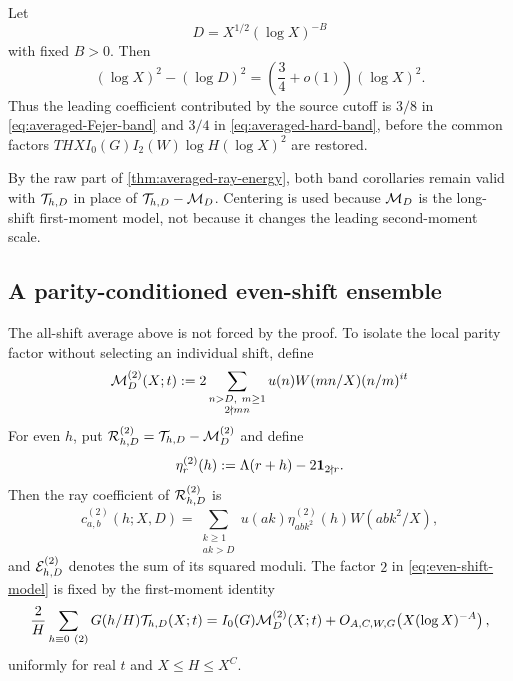 \begin{corollary}
\label{cor:TPC10-truncation}
Let
\[
 D=X^{1/2}(\log X)^{-B}
\]
with fixed $B>0$.  Then
\begin{equation}
 (\log X)^2-(\log D)^2
 =\left(\frac34+o(1)\right)(\log X)^2.
 \label{eq:three-quarter-source-energy}
\end{equation}
Thus the leading coefficient contributed by the source cutoff is
$3/8$ in \eqref{eq:averaged-Fejer-band} and $3/4$ in
\eqref{eq:averaged-hard-band}, before the common factors
$THX I_0(G)I_2(W)\log H(\log X)^2$ are restored.
\end{corollary}

\begin{remark}
By the raw part of \cref{thm:averaged-ray-energy}, both band corollaries
remain valid with $\mathcal T_{h,D}$ in place of $\mathcal T_{h,D}-\mathcal M_D$.  Centering is
used because $\mathcal M_D$ is the long-shift first-moment model, not because it
changes the leading second-moment scale.
\end{remark}

\subsection{A parity-conditioned even-shift ensemble}

The all-shift average above is not forced by the proof.  To isolate the
local parity factor without selecting an individual shift, define
\begin{equation}
 \mathcal M_D^{(2)}(X;t)
 :=2\sum_{\substack{n>D,\ m\geq1\\2\nmid mn}}
 u(n)W(mn/X)(n/m)^{it}
 \label{eq:even-shift-model}
\end{equation}
For even $h$, put $\mathcal R^{(2)}_{h,D}=\mathcal T_{h,D}-\mathcal M_D^{(2)}$ and define
\begin{equation}
 \eta_r^{(2)}(h):=\Lambda(r+h)-2\mathbf 1_{2\nmid r}.
 \label{eq:even-target-residual}
\end{equation}
Then the ray coefficient of $\mathcal R^{(2)}_{h,D}$ is
\begin{equation}
 c^{(2)}_{a,b}(h;X,D)
 =\sum_{\substack{k\geq1\\ak>D}}
 u(ak)\eta_{abk^2}^{(2)}(h)W(abk^2/X),
 \label{eq:even-ray-coefficient}
\end{equation}
and $\mathcal E^{(2)}_{h,D}$ denotes the sum of its squared moduli.  The factor
$2$ in \eqref{eq:even-shift-model} is fixed by the first-moment identity
\begin{equation}
 \frac2H\sum_{h\equiv0\ (2)}G(h/H)\mathcal T_{h,D}(X;t)
 =I_0(G)\mathcal M_D^{(2)}(X;t)
 +O_{A,C,W,G}\!\left(X(\log X)^{-A}\right),
 \label{eq:even-first-moment}
\end{equation}
uniformly for real $t$ and $X\leq H\leq X^C$.


